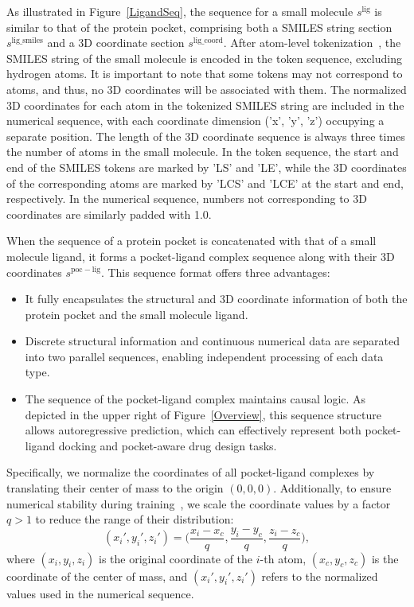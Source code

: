 As illustrated in Figure~\ref{LigandSeq}, the sequence for a small molecule $s^\mathrm{lig}$ is similar to that of the protein pocket, comprising both a SMILES string section $s^\mathrm{lig\_smiles}$ and a 3D coordinate section $s^\mathrm{lig\_coord}$.
After atom-level tokenization~\citep{SMILEStokenization}, the SMILES string of the small molecule is encoded in the token sequence, excluding hydrogen atoms. It is important to note that some tokens may not correspond to atoms, and thus, no 3D coordinates will be associated with them.
The normalized 3D coordinates for each atom in the tokenized SMILES string are included in the numerical sequence, with each coordinate dimension ('x', 'y', 'z') occupying a separate position. The length of the 3D coordinate sequence is always three times the number of atoms in the small molecule.
In the token sequence, the start and end of the SMILES tokens are marked by 'LS' and 'LE', while the 3D coordinates of the corresponding atoms are marked by 'LCS' and 'LCE' at the start and end, respectively.
In the numerical sequence, numbers not corresponding to 3D coordinates are similarly padded with 1.0.


When the sequence of a protein pocket is concatenated with that of a small molecule ligand, it forms a pocket-ligand complex sequence along with their 3D coordinates $s^\mathrm{poc-lig}$. This sequence format offers three advantages:
\begin{itemize}[leftmargin=*]
    \item It fully encapsulates the structural and 3D coordinate information of both the protein pocket and the small molecule ligand.
    \item Discrete structural information and continuous numerical data are separated into two parallel sequences, enabling independent processing of each data type.
    \item The sequence of the pocket-ligand complex maintains causal logic. As depicted in the upper right of Figure~\ref{Overview}, this sequence structure allows autoregressive prediction, which can effectively represent both pocket-ligand docking and pocket-aware drug design tasks.
\end{itemize}

Specifically, we normalize the coordinates of all pocket-ligand complexes by translating their center of mass to the origin $(0,0,0)$. Additionally, to ensure numerical stability during training~\citep{DeepLearning}, we scale the coordinate values by a factor $q>1$ to reduce the range of their distribution:
\begin{equation}
\label{coordnorm}
(x_i',y_i',z_i')=\Big(\frac{x_i-x_c}{q},\frac{y_i-y_c}{q},\frac{z_i-z_c}{q}\Big),
\end{equation}
where $(x_i,y_i,z_i)$ is the original coordinate of the $i$-th atom, $(x_c,y_c,z_c)$ is the coordinate of the center of mass, and $(x_i',y_i',z_i')$ refers to the normalized values used in the numerical sequence.

